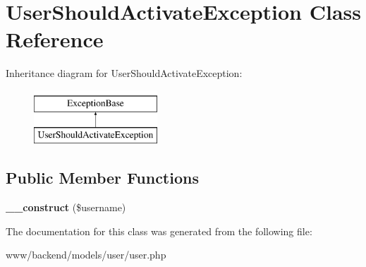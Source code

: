 \hypertarget{classUserShouldActivateException}{
\section{UserShouldActivateException Class Reference}
\label{classUserShouldActivateException}
}
Inheritance diagram for UserShouldActivateException:\begin{figure}[H]
\begin{center}
\leavevmode
\includegraphics[height=2.000000cm]{classUserShouldActivateException}
\end{center}
\end{figure}
\subsection*{Public Member Functions}
\begin{DoxyCompactItemize}
\item 
\hypertarget{classUserShouldActivateException_ad221ef639f2edece38678ab463a1e55a}{
{\bfseries \_\-\_\-construct} (\$username)}
\label{classUserShouldActivateException_ad221ef639f2edece38678ab463a1e55a}

\end{DoxyCompactItemize}


The documentation for this class was generated from the following file:\begin{DoxyCompactItemize}
\item 
www/backend/models/user/user.php\end{DoxyCompactItemize}
